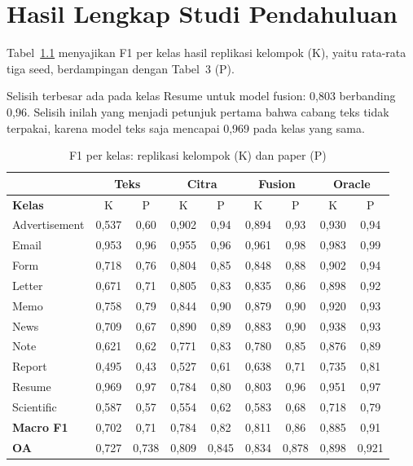 \chapter{Hasil Lengkap Studi Pendahuluan}\label{lam:hasil}

Tabel~\ref{tab:per-kelas} menyajikan F1 per kelas hasil replikasi kelompok (K), yaitu
rata-rata tiga seed, berdampingan dengan Tabel~3 \textcite{audebert2020} (P).

Selisih terbesar ada pada kelas Resume untuk model fusion: 0,803 berbanding 0,96. Selisih
inilah yang menjadi petunjuk pertama bahwa cabang teks tidak terpakai, karena model teks
saja mencapai 0,969 pada kelas yang sama.

\begin{table}[H]
  \centering
  \caption{F1 per kelas: replikasi kelompok (K) dan paper (P)}
  \label{tab:per-kelas}
  \fontsize{10}{12}\selectfont
  \begin{tabular}{|l|c|c|c|c|c|c|c|c|}
    \hline
    & \multicolumn{2}{c|}{\textbf{Teks}} & \multicolumn{2}{c|}{\textbf{Citra}} &
      \multicolumn{2}{c|}{\textbf{Fusion}} & \multicolumn{2}{c|}{\textbf{Oracle}} \\ \hline
    \textbf{Kelas} & K & P & K & P & K & P & K & P \\ \hline
    Advertisement & 0,537 & 0,60 & 0,902 & 0,94 & 0,894 & 0,93 & 0,930 & 0,94 \\ \hline
    Email         & 0,953 & 0,96 & 0,955 & 0,96 & 0,961 & 0,98 & 0,983 & 0,99 \\ \hline
    Form          & 0,718 & 0,76 & 0,804 & 0,85 & 0,848 & 0,88 & 0,902 & 0,94 \\ \hline
    Letter        & 0,671 & 0,71 & 0,805 & 0,83 & 0,835 & 0,86 & 0,898 & 0,92 \\ \hline
    Memo          & 0,758 & 0,79 & 0,844 & 0,90 & 0,879 & 0,90 & 0,920 & 0,93 \\ \hline
    News          & 0,709 & 0,67 & 0,890 & 0,89 & 0,883 & 0,90 & 0,938 & 0,93 \\ \hline
    Note          & 0,621 & 0,62 & 0,771 & 0,83 & 0,780 & 0,85 & 0,876 & 0,89 \\ \hline
    Report        & 0,495 & 0,43 & 0,527 & 0,61 & 0,638 & 0,71 & 0,735 & 0,81 \\ \hline
    Resume        & 0,969 & 0,97 & 0,784 & 0,80 & 0,803 & 0,96 & 0,951 & 0,97 \\ \hline
    Scientific    & 0,587 & 0,57 & 0,554 & 0,62 & 0,583 & 0,68 & 0,718 & 0,79 \\ \hline
    \textbf{Macro F1} & 0,702 & 0,71 & 0,784 & 0,82 & 0,811 & 0,86 & 0,885 & 0,91 \\ \hline
    \textbf{OA}       & 0,727 & 0,738 & 0,809 & 0,845 & 0,834 & 0,878 & 0,898 & 0,921 \\ \hline
  \end{tabular}
\end{table}

